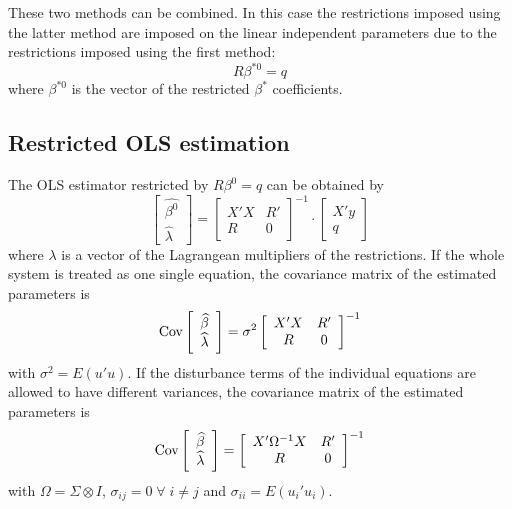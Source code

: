 These two methods can be combined.
In this case the restrictions imposed using the latter method are
imposed on the linear independent parameters due to the restrictions
imposed using the first method:
\begin{equation}
   R \beta^{*0} = q
\end{equation}
where $\beta^{*0}$ is the vector of the restricted $\beta^*$ coefficients.

\subsection{Restricted OLS estimation}
\label{sec:olsR}

The OLS estimator restricted by $R \beta^0 = q$ can be obtained by
\begin{equation}
   \left[ \begin{array}{c}
      \widehat{\beta^0} \\ \widehat{\lambda}
   \end{array} \right]
   =
   \left[ \begin{array}{cc}
      X' X & R' \\ 
      R & 0
   \end{array} \right]^{-1}
   \cdot
   \left[ \begin{array}{c}
      X' y \\ q 
   \end{array} \right]
\end{equation}
where $\lambda$ is a vector of the Lagrangean multipliers of the restrictions.
If the whole system is treated as one single equation,
the covariance matrix of the estimated parameters is
\begin{equation}
   \text{Cov} 
   \left[ \begin{array}{c}
      \widehat{\beta} \\ \widehat{\lambda}
   \end{array} \right] 
   = \sigma^2 
   \left[ \begin{array}{cc}
      X' X & R' \\ 
      R & 0
   \end{array} \right]^{-1}
\end{equation}
with $\sigma^2 = E \left( u' u \right)$.
If the disturbance terms of the individual equations
are allowed to have different variances, 
the covariance matrix of the estimated parameters is
\begin{equation}
   \text{Cov} 
   \left[ \begin{array}{c}
      \widehat{\beta} \\ \widehat{\lambda}
   \end{array} \right] 
   = 
   \left[ \begin{array}{cc}
      X' \Omega^{-1} X & R' \\ 
      R & 0
   \end{array} \right]^{-1}
\end{equation}
with $\Omega = \Sigma \otimes I$, 
$\sigma_{ij} = 0 \; \forall \; i \neq j$ and
$\sigma_{ii} = E \left( u_i' u_i \right)$.

